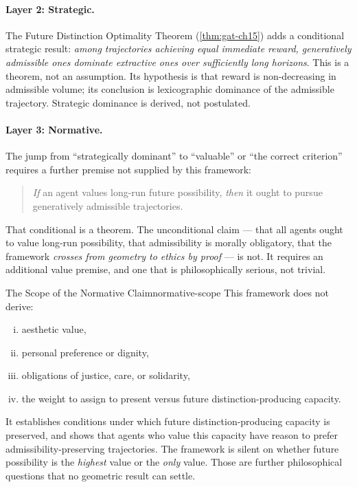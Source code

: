 \documentclass[12pt,twoside,openright]{book}
\begin{document}
\paragraph{Layer 2: Strategic.}
The Future Distinction Optimality Theorem
(\cref{thm:gat-ch15}) adds a conditional strategic result:
\emph{among trajectories achieving equal immediate reward,
generatively admissible ones dominate extractive ones over
sufficiently long horizons}. This is a theorem, not an
assumption. Its hypothesis is that reward is non-decreasing
in admissible volume; its conclusion is lexicographic
dominance of the admissible trajectory. Strategic dominance
is derived, not postulated.

\paragraph{Layer 3: Normative.}
The jump from ``strategically dominant'' to ``valuable'' or
``the correct criterion'' requires a further premise not
supplied by this framework:
\begin{quote}
  \emph{If} an agent values long-run future possibility,
  \emph{then} it ought to pursue generatively admissible
  trajectories.
\end{quote}
That conditional is a theorem. The unconditional claim ---
that all agents ought to value long-run possibility, that
admissibility is morally obligatory, that the framework
\emph{crosses from geometry to ethics by proof} --- is not.
It requires an additional value premise, and one that is
philosophically serious, not trivial.

\begin{remark}{The Scope of the Normative Claim}{normative-scope}
  This framework does not derive:
  \begin{enumerate}[(i)]
    \item aesthetic value,
    \item personal preference or dignity,
    \item obligations of justice, care, or solidarity,
    \item the weight to assign to present versus future
          distinction-producing capacity.
  \end{enumerate}
  It establishes conditions under which future
  distinction-producing capacity is preserved, and shows
  that agents who value this capacity have reason to prefer
  admissibility-preserving trajectories. The framework is
  silent on whether future possibility is the \emph{highest}
  value or the \emph{only} value. Those are further
  philosophical questions that no geometric result can
  settle.
\end{remark}
\end{document}
